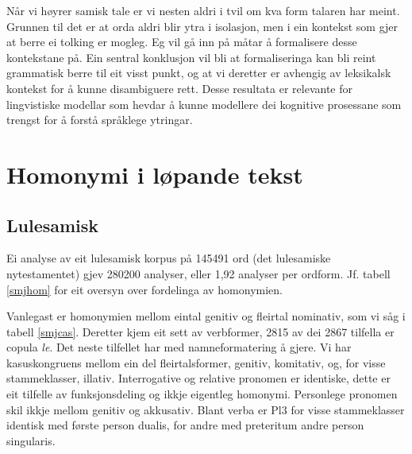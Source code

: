 \documentclass[a4paper,nynorsk]{article}
\begin{document}
Når vi høyrer samisk tale er vi nesten aldri i tvil om kva form talaren har meint. Grunnen til det er at orda aldri blir ytra i isolasjon, men i ein kontekst som gjer at berre ei tolking er mogleg. Eg vil gå inn på måtar å formalisere desse kontekstane på. Ein sentral konklusjon vil bli at formaliseringa kan bli reint grammatisk berre til eit visst punkt, og at vi deretter er avhengig av leksikalsk kontekst for å kunne disambiguere rett. Desse resultata er relevante for lingvistiske modellar som hevdar å kunne modellere dei kognitive prosessane som trengst for å forstå språklege ytringar.%

\section{Homonymi i løpande tekst}


\subsection{Lulesamisk} 
 
Ei analyse av eit lulesamisk korpus på 145491 ord (det lulesamiske nytestamentet) gjev 280200  analyser, eller 1,92 analyser per ordform. Jf. tabell \ref{smjhom} for eit oversyn over fordelinga av homonymien.%

Vanlegast er homonymien mellom eintal genitiv og fleirtal nominativ, som vi såg i tabell \ref{smjcas}. Deretter kjem eit sett av verbformer, 2815 av dei 2867 tilfella er copula \emph{le}. Det neste tilfellet har med namneformatering å gjere. Vi har kasuskongruens mellom ein del fleirtalsformer, genitiv, komitativ, og, for visse stammeklasser, illativ. Interrogative og relative pronomen er identiske, dette er eit tilfelle av funksjonsdeling og ikkje eigentleg homonymi. Personlege pronomen skil ikkje mellom genitiv og akkusativ. Blant verba er Pl3 for visse stammeklasser identisk med første person dualis, for andre med preteritum andre person singularis.%
\end{document}
